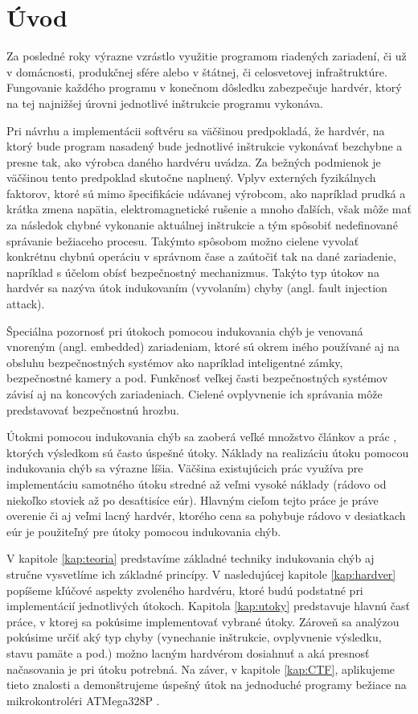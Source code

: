 \chapter*{Úvod} %

Za posledné roky výrazne vzrástlo využitie programom riadených zariadení, či už v domácnosti, produkčnej sfére alebo v štátnej, či celosvetovej infraštruktúre. Fungovanie každého programu v konečnom dôsledku zabezpečuje hardvér, ktorý na tej najnižšej úrovni jednotlivé inštrukcie programu vykonáva. 

Pri návrhu a implementácii softvéru sa väčšinou predpokladá, že hardvér, na ktorý bude program nasadený bude jednotlivé inštrukcie vykonávať bezchybne a presne tak, ako výrobca daného hardvéru uvádza. Za bežných podmienok je väčšinou tento predpoklad skutočne naplnený. Vplyv externých fyzikálnych faktorov, ktoré sú mimo špecifikácie udávanej výrobcom, ako napríklad prudká a krátka zmena napätia, elektromagnetické rušenie a mnoho ďalších, však môže mať za následok chybné vykonanie aktuálnej inštrukcie a tým spôsobiť nedefinované správanie bežiaceho procesu. Takýmto spôsobom možno cielene vyvolať konkrétnu chybnú operáciu v správnom čase a zaútočiť tak na dané zariadenie, napríklad s účelom obísť bezpečnostný mechanizmus. Takýto typ útokov na hardvér sa nazýva útok indukovaním (vyvolaním) chyby (angl. fault injection attack).

Špeciálna pozornosť pri útokoch pomocou indukovania chýb je venovaná vnoreným (angl. embedded) zariadeniam, ktoré sú okrem iného používané aj na obsluhu bezpečnostných systémov ako napríklad inteligentné zámky, bezpečnostné kamery a pod. Funkčnosť veľkej časti bezpečnostných systémov závisí aj na koncových zariadeniach. Cielené ovplyvnenie ich správania môže predstavovať bezpečnostnú hrozbu. 

Útokmi pomocou indukovania chýb sa zaoberá veľké množstvo článkov a prác \cite{crowbars, clock, lowcost, crypto, emfi, powerGlitch, AntiFI}, ktorých výsledkom sú často úspešné útoky. Náklady na realizáciu útoku pomocou indukovania chýb sa výrazne líšia. Väčšina existujúcich prác využíva pre implementáciu samotného útoku stredné až veľmi vysoké náklady (rádovo od niekoľko stoviek až po desaťtisíce eúr). Hlavným cieľom tejto práce je práve overenie či aj veľmi lacný hardvér, ktorého cena sa pohybuje rádovo v desiatkach eúr je použiteľný pre útoky pomocou indukovania chýb.

V kapitole \ref{kap:teoria} predstavíme základné techniky indukovania chýb aj stručne vysvetlíme ich základné princípy. V nasledujúcej kapitole \ref{kap:hardver} popíšeme kľúčové aspekty zvoleného hardvéru, ktoré budú podstatné pri implementácií jednotlivých útokoch. Kapitola \ref{kap:utoky} predstavuje hlavnú časť práce, v ktorej sa pokúsime implementovať vybrané útoky. Zároveň sa analýzou pokúsime určiť aký typ chyby (vynechanie inštrukcie, ovplyvnenie výsledku, stavu pamäte a pod.) možno lacným hardvérom dosiahnuť a aká presnosť načasovania je pri útoku potrebná. Na záver, v kapitole \ref{kap:CTF}, aplikujeme tieto znalosti a demonštrujeme úspešný útok na jednoduché programy bežiace na mikrokontroléri ATMega328P \cite{atmegaData}.